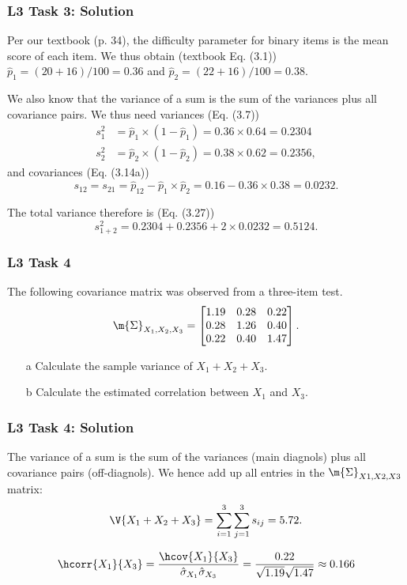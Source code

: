 \documentclass[compress]{beamer}\usepackage[]{graphicx}\usepackage[]{xcolor}
\begin{document}
\begin{frame}[fragile]
  \frametitle{L3 Task 3: Solution}
    Per our textbook (p. 34), the difficulty parameter for binary items is the mean score of each item. We thus obtain (textbook Eq. (3.1)) $\hat{p}_1 = (20 + 16) / 100 = 0.36$ and $\hat{p}_2 = (22 + 16)/100 = 0.38$.

    We also know that the variance of a sum is the sum of the variances plus all covariance pairs. We thus need variances (Eq. (3.7))
    \begin{equation*}
      \begin{aligned}
        s_1^2 &= \hat{p}_1 \times \left( 1 - \hat{p}_1 \right) = 0.36 \times 0.64 = 0.2304 \\
        s_2^2 &= \hat{p}_2 \times \left( 1 - \hat{p}_2 \right) = 0.38 \times 0.62 = 0.2356,
      \end{aligned}
    \end{equation*}
    and covariances (Eq. (3.14a))
    \[ s_{12} = s_{21} = \hat{p}_{12} - \hat{p}_1 \times \hat{p}_2 = 0.16 - 0.36 \times 0.38 = 0.0232. \]

    The total variance therefore is (Eq. (3.27))
    \[ s_{1+2}^2 = 0.2304 + 0.2356 + 2 \times 0.0232 = 0.5124. \]
\end{frame}


\begin{frame}[fragile]
  \frametitle{L3 Task 4}
    The following covariance matrix was observed from a three-item test.
    \begin{equation*}
      \m{\Sigma}_{X_1, X_2, X_3} =
        \begin{bmatrix}
          1.19 & 0.28 & 0.22\\
          0.28 & 1.26 & 0.40\\
          0.22 & 0.40 & 1.47
        \end{bmatrix}.
    \end{equation*}

    \begin{itemize}
      \item[a] Calculate the sample variance of $X_1+X_2+X_3$.
      \item[b] Calculate the estimated correlation between $X_1$ and $X_3$.
    \end{itemize}
\end{frame}


\begin{frame}[fragile]
  \frametitle{L3 Task 4: Solution}
    The variance of a sum is the sum of the variances (main diagnols) plus all covariance pairs (off-diagnols). We hence add up all entries in the $\m{\Sigma}_{X1,X2,X3}$ matrix:
    \[ \V{X_1 + X_2 + X_3} = \sum_{i=1}^3 \sum_{j=1}^3 s_{ij} = 5.72. \]

    \[ \hcorr{X_1}{X_3} = \frac{\hcov{X_1}{X_3}}{\hat{\sigma}_{X_1} \hat{\sigma}_{X_3}} = \frac{0.22}{\sqrt{1.19} \sqrt{1.47}} \approx 0.166 \]
\end{frame}
\end{document}
